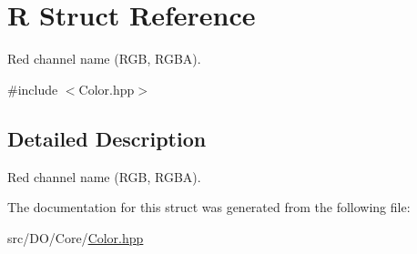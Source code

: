 \hypertarget{struct_d_o_1_1_r}{\section{R Struct Reference}
\label{struct_d_o_1_1_r}
}


Red channel name (R\-G\-B, R\-G\-B\-A).  




{\ttfamily \#include $<$Color.\-hpp$>$}



\subsection{Detailed Description}
Red channel name (R\-G\-B, R\-G\-B\-A). 

The documentation for this struct was generated from the following file\-:\begin{DoxyCompactItemize}
\item 
src/\-D\-O/\-Core/\hyperlink{_color_8hpp}{Color.\-hpp}\end{DoxyCompactItemize}

